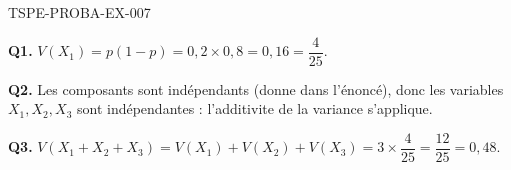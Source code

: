 \begin{corrige}{TSPE-PROBA-EX-007}

\textbf{Q1.} $V(X_1) = p(1-p) = 0{,}2\times0{,}8 = 0{,}16 = \dfrac{4}{25}$.

\textbf{Q2.} Les composants sont indépendants (donne dans l'énoncé), donc les variables $X_1,X_2,X_3$ sont indépendantes : l'additivite de la variance s'applique.

\textbf{Q3.} $V(X_1+X_2+X_3) = V(X_1)+V(X_2)+V(X_3) = 3\times\dfrac{4}{25} = \boxed{\dfrac{12}{25}} = 0{,}48$.

\end{corrige}
